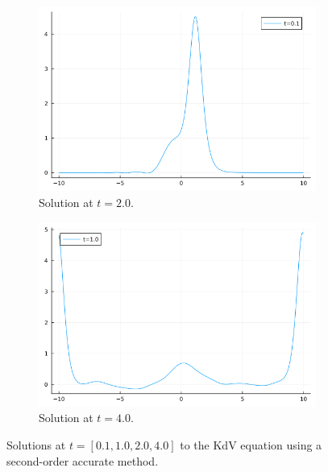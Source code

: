 \documentclass[12pt]{report}
\begin{document}
\begin{solution}
\begin{enumerate}
\begin{figure}[H]
\begin{subfigure}[b]{0.45\linewidth}
                \centering
                \includegraphics[width=\linewidth]{images/2-1.png}
                \caption{Solution at $t=2.0$.}
                \label{fig2:c}
                \vspace{4ex}
            \end{subfigure}%
            \begin{subfigure}[b]{0.45\linewidth}
                \centering
                \includegraphics[width=\linewidth]{images/2-2.png}
                \caption{Solution at $t=4.0$.}
                \label{fig2:d}
                \vspace{4ex}
            \end{subfigure}
            \caption{Solutions at $t=[0.1,1.0,2.0,4.0]$ to the KdV equation using a second-order accurate method.}
            \label{fig2}
        \end{figure}



\end{enumerate}
\end{solution}
\end{document}
